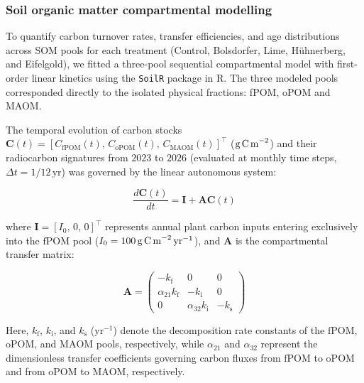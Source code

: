 \documentclass[preprint,12pt]{elsarticle}
\begin{document}
  
\subsubsection{Soil organic matter compartmental modelling}
To quantify carbon turnover rates, transfer efficiencies, and age distributions across SOM pools for each treatment (Control, Bolsdorfer, Lime, H\"{u}hnerberg, and Eifelgold), we fitted a three-pool sequential compartmental model with first-order linear kinetics using the \texttt{SoilR} package \citep{Sierra2012, Sierra2014} in R. The three modeled pools corresponded directly to the isolated physical fractions: fPOM, oPOM and MAOM.

The temporal evolution of carbon stocks $\mathbf{C}(t) = [C_{\text{fPOM}}(t),\, C_{\text{oPOM}}(t),\, C_{\text{MAOM}}(t)]^{\top}$ ($\text{g\,C\,m}^{-2}$) and their radiocarbon signatures from $2023$ to $2026$ (evaluated at monthly time steps, $\Delta t = 1/12\,\text{yr}$) was governed by the linear autonomous system:

\begin{equation}
\frac{d\mathbf{C}(t)}{dt} = \mathbf{I} + \mathbf{A}\mathbf{C}(t)
\end{equation}

where $\mathbf{I} = [I_0,\, 0,\, 0]^{\top}$ represents annual plant carbon inputs entering exclusively into the $\text{fPOM}$ pool ($I_0 = 100\,\text{g\,C\,m}^{-2}\,\text{yr}^{-1}$), and $\mathbf{A}$ is the compartmental transfer matrix:

\begin{equation}
\mathbf{A} = \begin{pmatrix}
-k_{\text{f}} & 0 & 0 \\
\alpha_{21} k_{\text{f}} & -k_{\text{i}} & 0 \\
0 & \alpha_{32} k_{\text{i}} & -k_{\text{s}}
\end{pmatrix}
\end{equation}

Here, $k_{\text{f}}$, $k_{\text{i}}$, and $k_{\text{s}}$ ($\text{yr}^{-1}$) denote the decomposition rate constants of the $\text{fPOM}$, $\text{oPOM}$, and $\text{MAOM}$ pools, respectively, while $\alpha_{21}$ and $\alpha_{32}$ represent the dimensionless transfer coefficients governing carbon fluxes from $\text{fPOM}$ to $\text{oPOM}$ and from $\text{oPOM}$ to $\text{MAOM}$, respectively.
\end{document}
